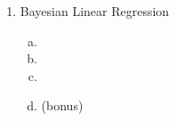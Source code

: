 \documentclass[12pt,twoside]{article}
\begin{document}
\begin{enumerate}[1)]
\begin{enumerate}[a)]
\begin{enumerate}[i)]
\item 
\item
\end{enumerate}

\end{enumerate}

\item Bayesian Linear Regression


\begin{enumerate}[a)]
\addtocounter{enumii}{1} 
\item 
\item
\item 
\item (bonus)
\end{enumerate}

\end{enumerate}
\end{document}
